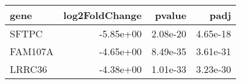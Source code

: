 \begin{tabular}{lrrr}
\toprule
   gene &  log2FoldChange &   pvalue &     padj \\
\midrule
  SFTPC &       -5.85e+00 & 2.08e-20 & 4.65e-18 \\
FAM107A &       -4.65e+00 & 8.49e-35 & 3.61e-31 \\
 LRRC36 &       -4.38e+00 & 1.01e-33 & 3.23e-30 \\
\bottomrule
\end{tabular}
